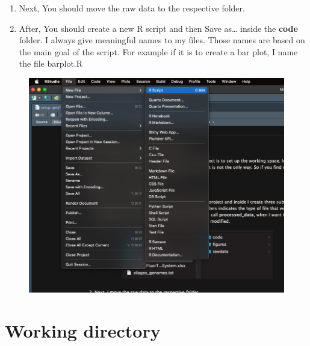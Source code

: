 \documentclass[
  letterpaper,
  DIV=11,
  numbers=noendperiod]{scrartcl}
\providecommand{\tightlist}{%
  \setlength{\itemsep}{0pt}\setlength{\parskip}{0pt}}\usepackage{longtable,booktabs,array}
\begin{document}
\begin{enumerate}
\def\labelenumi{\arabic{enumi}.}
\setcounter{enumi}{1}
\tightlist
\item
  Next, You should move the raw data to the respective folder.
\item
  After, You should create a new R script and then Save as\ldots{}
  inside the \textbf{code} folder. I always give meaningful names to my
  files. Those names are based on the main goal of the script. For
  example if it is to create a bar plot, I name the file barplot.R
\end{enumerate}

\begin{figure}[H]

{\centering \includegraphics[width=6.25in,height=\textheight]{newfile.png}

}

\end{figure}

\hypertarget{working-directory}{%
\section{Working directory}\label{working-directory}}
\end{document}
